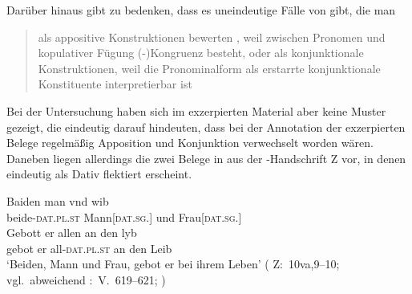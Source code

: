 Darüber hinaus gibt \citet{gjelsten1980} zu bedenken, dass es
uneindeutige Fälle von  gibt, die man
\blockcquote[187]{gjelsten1980}{als appositive Konstruktionen
bewerten , weil zwischen Pronomen und kopulativer Fügung
(-)Kongruenz besteht, oder als konjunktionale Konstruktionen, weil
die Pronominalform als erstarrte konjunktionale Konstituente interpretierbar
ist}.

Bei der Untersuchung haben sich im exzerpierten Material aber keine Muster
gezeigt, die eindeutig darauf hindeuten, dass bei der Annotation
der exzerpierten Belege regelmäßig Apposition und Konjunktion
verwechselt worden wären. Daneben liegen allerdings die zwei Belege in
 aus der \KC{}-Handschrift Z vor, in denen
 eindeutig als Dativ flektiert erscheint.

\begin{exe}
\ex \label{ex:kczbeidenundesynt1}
\begin{xlist}
	\ex \label{ex:kczbeidenundesynt1_1}
		\gll Baiden man vnd wib \\
			beide-\textsc{dat.pl\subMF.st} Mann[\textsc{dat.sg.\MascM}] und
				Frau[\textsc{dat.sg.\NeutF}] \\
	\sn \gll Gebott er allen an den lyb \\
			gebot er all-\textsc{dat.pl\subMF.st} an den Leib \\
		\trans `Beiden, Mann und Frau, gebot er bei ihrem Leben'
			(%
				Z:~10va,9--10; vgl.~abweichend
				\KC:~V.~619--621;
				\cite[92]{schroeder1895}%
			)

\end{xlist}
\end{exe}

